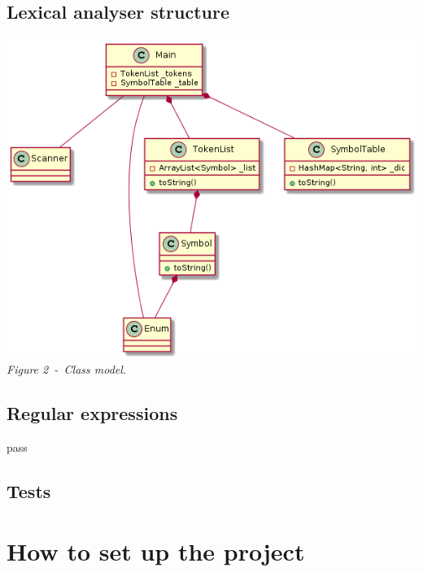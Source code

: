\documentclass[a4paper,11pt]{article}
\begin{document}
  \subsection{Lexical analyser structure}
    \begin{center}
      \includegraphics[scale=0.4]{./img/class_diag.png}\\
      \textit{Figure 2~-~Class model.}
    \end{center}
  
  \subsection{Regular expressions}
    pass
    
  \subsection{Tests}
    
    
    

\section{How to set up the project}
\end{document}
